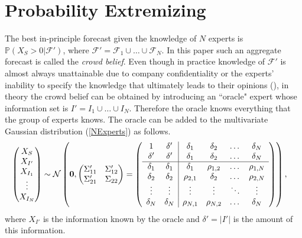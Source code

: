 \documentclass[11pt]{article}
\renewcommand{\P}{\mathbb{P}}
\theoremstyle{definition}
\theoremstyle{definition}
\begin{document}
\section{Probability Extremizing}
\label{extremizing}
The best in-principle forecast given the knowledge of $N$ experts is $\P(X_{S} > 0 |  \mathcal{F}')$, where $\mathcal{F}' = \mathcal{F}_1 \cup \dots \cup \mathcal{F}_N$. In this paper such an aggregate forecast is called the \textit{crowd belief}. Even though in practice knowledge of $\mathcal{F}'$ is almost always unattainable due to company confidentiality or the experts' inability to specify the knowledge that ultimately leads to their opinions (\cite{dawid1995coherent}), in theory the crowd belief can be obtained by introducing an ``oracle" expert whose information set is $I' = I_1 \cup \dots \cup I_N$. Therefore the oracle  knows everything that the group of experts knows. The oracle can be added to the multivariate Gaussian distribution (\ref{NExperts}) as follows.
\begin{align}
\left(\begin{matrix} X_S \\ X_{I'} \\ X_{I_1}\\ \vdots \\ X_{I_N} \end{matrix}\right) &\sim \mathcal{N}\left( 
 \boldsymbol{0}, \left(\begin{matrix} 
\Sigma_{11}' & \Sigma_{12}'\\
\Sigma_{21}' & \Sigma_{22}\\
 \end{matrix}\right) 
 =
 \left(\begin{array}{c c| c c cc }
1 & \delta' & \delta_1 & \delta_2 & \dots & \delta_N  \\ 
\delta' & \delta' & \delta_1 & \delta_2 & \dots & \delta_N  \\ \hline
\delta_1& \delta_1 & \delta_1 &\rho_{1,2} & \dots & \rho_{1,N}   \\ 
\delta_2 & \delta_2 &\rho_{2,1} & \delta_2 & \dots & \rho_{2,N}  \\ 
\vdots &\vdots & \vdots & \vdots & \ddots & \vdots  \\ 
\delta_N &\delta_N & \rho_{N,1} & \rho_{N,2} & \dots & \delta_N\\ 
 \end{array}\right)\right),  \label{NExpertsOracle}
\end{align}
where  $X_{I'}$  is the information known by the oracle and $\delta' = |I'|$ is the amount of this information. 
\end{document}

